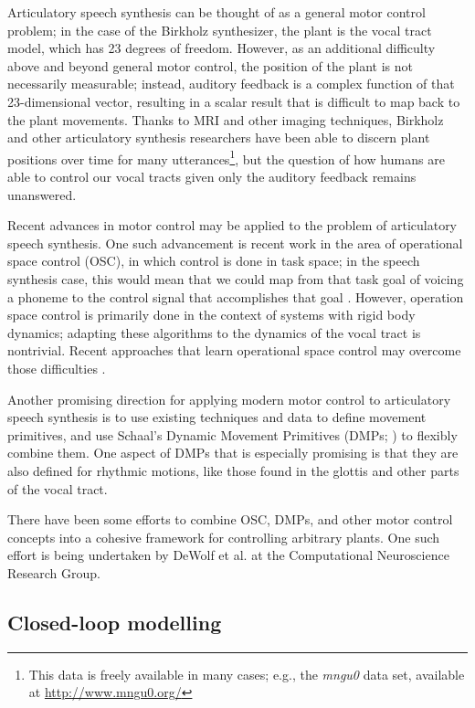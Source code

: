 \documentclass{article}
\begin{document}
Articulatory speech synthesis
can be thought of as a
general motor control problem;
in the case of the Birkholz synthesizer,
the plant is the vocal tract model,
which has 23 degrees of freedom.
However, as an additional difficulty
above and beyond general motor control,
the position of the plant is
not necessarily measurable;
instead, auditory feedback is
a complex function of that
23-dimensional vector,
resulting in a scalar result
that is difficult to map
back to the plant movements.
Thanks to MRI and other
imaging techniques,
Birkholz and other articulatory
synthesis researchers have
been able to discern
plant positions over time
for many utterances\footnote{This
data is freely available in many cases;
e.g., the \textit{mngu0} data set,
available at \url{http://www.mngu0.org/}},
but the question of how humans
are able to control our vocal tracts
given only the auditory feedback
remains unanswered.

Recent advances in motor control
may be applied to the problem
of articulatory speech synthesis.
One such advancement is recent work
in the area of operational space control (OSC),
in which control is done in task space;
in the speech synthesis case,
this would mean that we could
map from that task goal
of voicing a phoneme
to the control signal
that accomplishes that goal
\citep{nakanishi2008}.
However, operation space control
is primarily done in the context
of systems with rigid body dynamics;
adapting these algorithms
to the dynamics of the vocal tract
is nontrivial.
Recent approaches that learn
operational space control
may overcome those difficulties
\citep{peters2008}.

Another promising direction
for applying modern motor control
to articulatory speech synthesis
is to use existing techniques and data
to define movement primitives,
and use Schaal's Dynamic Movement Primitives
(DMPs; \citealp{schaal2006})
to flexibly combine them.
One aspect of DMPs that is especially promising
is that they are also defined
for rhythmic motions,
like those found in the glottis
and other parts of the vocal tract.

There have been some efforts
to combine OSC, DMPs, and other motor control concepts
into a cohesive framework
for controlling arbitrary plants.
One such effort is being undertaken
by DeWolf et al. at the
Computational Neuroscience Research Group.

\subsection{Closed-loop modelling}
\label{subsec:closed-loop}
\end{document}
